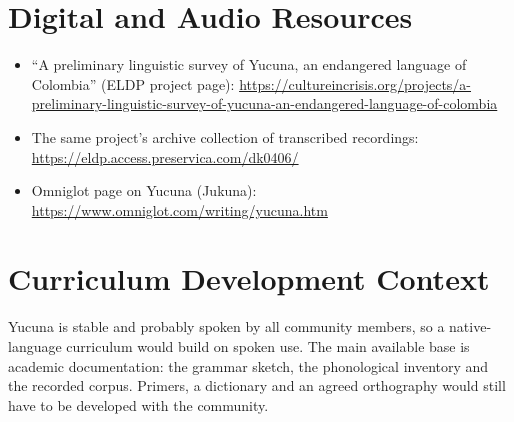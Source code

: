 \documentclass[12pt]{article}
\begin{document}
\section{Digital and Audio Resources}
\begin{itemize}
\item ``A preliminary linguistic survey of Yucuna, an endangered language of Colombia'' (ELDP project page): \url{https://cultureincrisis.org/projects/a-preliminary-linguistic-survey-of-yucuna-an-endangered-language-of-colombia}
\item The same project's archive collection of transcribed recordings: \url{https://eldp.access.preservica.com/dk0406/}
\item Omniglot page on Yucuna (Jukuna): \url{https://www.omniglot.com/writing/yucuna.htm}
\end{itemize}

\section{Curriculum Development Context}
Yucuna is stable and probably spoken by all community members, so a native-language curriculum would build on spoken use. The main available base is academic documentation: the grammar sketch, the phonological inventory and the recorded corpus. Primers, a dictionary and an agreed orthography would still have to be developed with the community.
\end{document}

